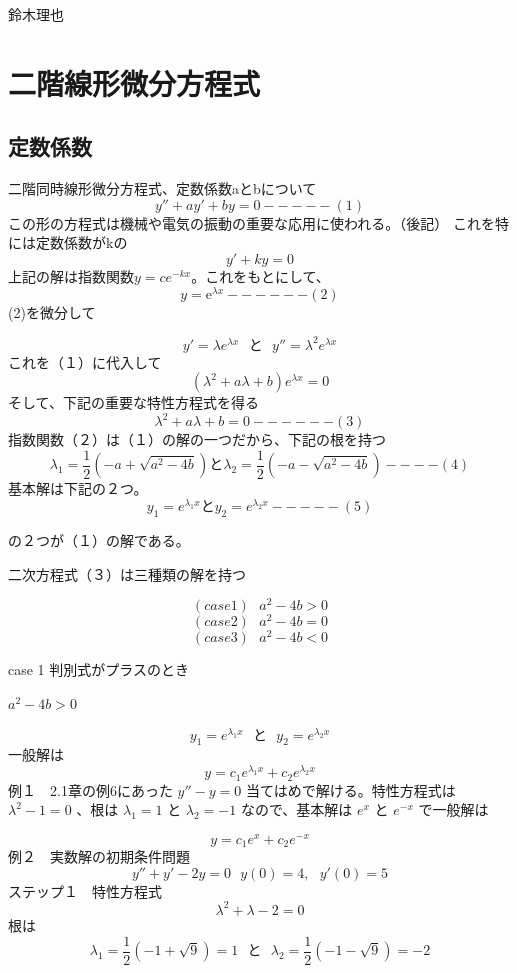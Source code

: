 \documentclass[uplatex]{jsarticle}
\begin{document}
\begin{flushright}
  鈴木理也
\end{flushright}

\setcounter{section}{1}
\section{二階線形微分方程式}
\subsection{定数係数}
\large
 二階同時線形微分方程式、定数係数aとbについて
 $$y''+ay'+by=0 -----(1)$$
 この形の方程式は機械や電気の振動の重要な応用に使われる。（後記）
 これを特には定数係数がkの
 $$y' + ky =0 $$
 上記の解は指数関数$y=c e^{-kx} $。これをもとにして、
 $$y=\mathrm{e}^{\lambda x}------(2)$$
 (2)を微分して


 $$ y'= {\lambda} e^{\lambda x} \ \  \ と\ \ \ y''= {\lambda}^2 e^{\lambda x} $$
 これを（１）に代入して
 $$ (\lambda^2 + a\lambda + b){e}^{\lambda x} = 0 $$
そして、下記の重要な特性方程式を得る
$$ \lambda ^2 + a\lambda + b = 0 ------(3) $$
指数関数（２）は（１）の解の一つだから、下記の根を持つ
 $$ {\lambda} _1 = \frac{1}{2}(-a + \sqrt{a^2-4b})  と 
 {\lambda} _2 = \frac{1}{2}(-a - \sqrt{a^2-4b}) ----(4)$$
基本解は下記の２つ。
 $$ y_1 = {e}^{\lambda _1 x} と 
 y_2 = {e}^{\lambda _2 x} -----(5)$$ 


 の２つが（１）の解である。


 二次方程式（３）は三種類の解を持つ

 $$ (case1)\ \ \  a^2 -4b >0$$
 $$( case2)\ \ \ a^2 -4b =0$$
 $$ (case3)\ \ \  a^2 -4b <0$$

\newpage

 \LARGE case 1 判別式がプラスのとき  
 \large


  $ a^2 -4b >0$ 

 $$ y_1 = {e}^{\lambda _1 x}  \ \ \ と\ \ \  
  y_2 = {e}^{\lambda _2 x} $$ 
一般解は
  $$ y =c_1{e}^{\lambda _1 x} + c_2{e}^{\lambda _2 x}$$ 
例１　2.1章の例6にあった 
$y''-y=0$ 
当てはめで解ける。特性方程式は
${\lambda}^2-1=0$
、根は
${\lambda _1}=1$
と
${\lambda _2}=-1$
なので、基本解は
${e}^{x}$
と
${e}^{-x}$
で一般解は

$$y=c_1{e}^{x}+c_2{e}^{-x}$$
例２　実数解の初期条件問題
  $$ y'' + y' -2y =0 \ \ \ y(0)=4,\ \ \ y'(0)=5 $$
  ステップ１　特性方程式
  $$ {\lambda}^2 + {\lambda} -2 =0$$
  根は
 $$ {\lambda} _1 = \frac{1}{2}(-1 + \sqrt{9}) =1\ \ \ と\ \ \  
  {\lambda} _2 = \frac{1}{2}(-1 - \sqrt{9}) =-2 $$
\end{document}
